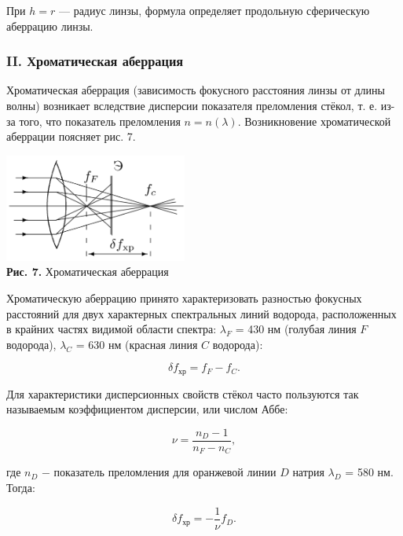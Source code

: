 \documentclass[a4paper,12pt]{article} %
\begin{document}
\hfill \break При $h = r$ — радиус линзы, формула определяет продольную сферическую аберрацию линзы.

\subsubsection*{II. Хроматическая аберрация}
\hfill \break Хроматическая аберрация (зависимость фокусного расстояния линзы от длины волны) возникает вследствие дисперсии показателя преломления стёкол, т. е. из-за того, что показатель преломления $n = n(\lambda)$. Возникновение хроматической аберрации поясняет рис. 7.

\begin{center}
\includegraphics[width=0.45\textwidth]{4.1.1_6.png}\\
\textbf{Рис. 7.} Хроматическая аберрация \\
\end{center}

\hfill \break Хроматическую аберрацию принято характеризовать разностью фокусных расстояний для двух характерных спектральных линий водорода, расположенных в крайних частях видимой области спектра: $\lambda_F$ = 430 нм (голубая линия $F$ водорода), $\lambda_C$ = 630 нм (красная линия $C$ водорода):

\begin{equation}
	\delta f_{\text{хр}} = f_F - f_C.
    \label{eq:9}
\end{equation}

\hfill \break Для характеристики дисперсионных свойств стёкол часто пользуются так называемым коэффициентом дисперсии, или числом Аббе:
	
\begin{equation}
\nu = \frac{n_D - 1}{n_F - n_C},
\end{equation}

\hfill \break где $n_D$ $-$ показатель преломления для оранжевой линии $D$ натрия $\lambda_D$ = 580 нм. Тогда:

\begin{equation}
\delta f_{\text{хр}} = -\frac{1}{\nu} f_D.
\label{eq:11}
\end{equation}
\end{document}
